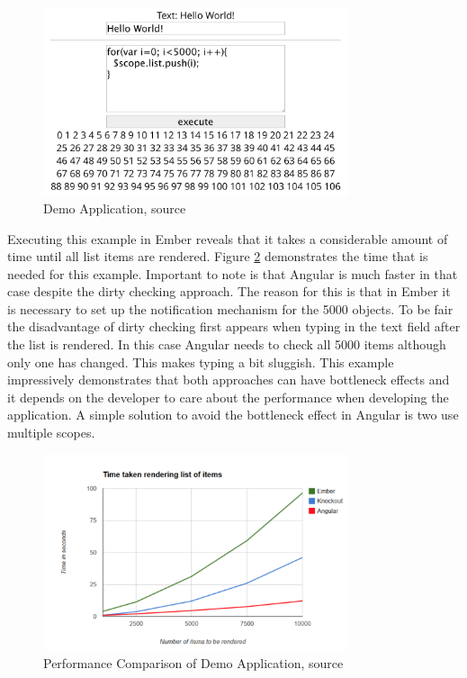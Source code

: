 \begin{figure}
	\centering	
	\includegraphics[width=0.8\textwidth]{./img/tech-ana/performance_demo_app.png}
	\caption{Demo Application, source \autocite{binding_comparison}}
	\label{fig:demo_app}
\end{figure} 

Executing this example in Ember reveals that it takes a considerable amount of time until all list items are rendered.
Figure \ref{fig:performance_demo_app} demonstrates the time that is needed for this example. 
Important to note is that Angular is much faster in that case despite the dirty checking approach. 
The reason for this is that in Ember it is necessary to set up the notification mechanism for the 5000 objects.
To be fair the disadvantage of dirty checking first appears when typing in the text field after the list is rendered. 
In this case Angular needs to check all 5000 items although only one has changed. 
This makes typing a bit sluggish. 
This example impressively demonstrates that both approaches can have bottleneck effects and it depends on the developer to care about the performance when developing the application. 
A simple solution to avoid the bottleneck effect in Angular is two use multiple scopes.

\begin{figure}
	\centering	
	\includegraphics[width=0.8\textwidth]{./img/tech-ana/performance_comp.png}
	\caption{Performance Comparison of Demo Application, source \autocite{binding_comparison}}
	\label{fig:performance_demo_app}
\end{figure} 

